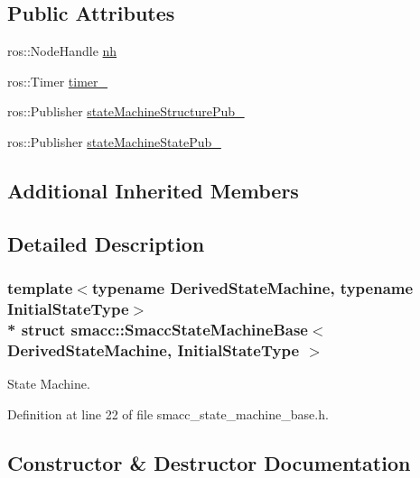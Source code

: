 \subsection*{Public Attributes}
\begin{DoxyCompactItemize}
\item 
ros\+::\+Node\+Handle \hyperlink{structsmacc_1_1SmaccStateMachineBase_a191b29227e32c440c936ac05359e9cd5}{nh}
\item 
ros\+::\+Timer \hyperlink{structsmacc_1_1SmaccStateMachineBase_a7fc7227a0c6321cf7253683a1f38c4f8}{timer\+\_\+}
\item 
ros\+::\+Publisher \hyperlink{structsmacc_1_1SmaccStateMachineBase_af586b32d0f79caba26c2dbca76a55767}{state\+Machine\+Structure\+Pub\+\_\+}
\item 
ros\+::\+Publisher \hyperlink{structsmacc_1_1SmaccStateMachineBase_a7c76e7a7d6c00d9831472297ff51e38c}{state\+Machine\+State\+Pub\+\_\+}
\end{DoxyCompactItemize}
\subsection*{Additional Inherited Members}


\subsection{Detailed Description}
\subsubsection*{template$<$typename Derived\+State\+Machine, typename Initial\+State\+Type$>$\\*
struct smacc\+::\+Smacc\+State\+Machine\+Base$<$ Derived\+State\+Machine, Initial\+State\+Type $>$}

State Machine. 

Definition at line 22 of file smacc\+\_\+state\+\_\+machine\+\_\+base.\+h.



\subsection{Constructor \& Destructor Documentation}
